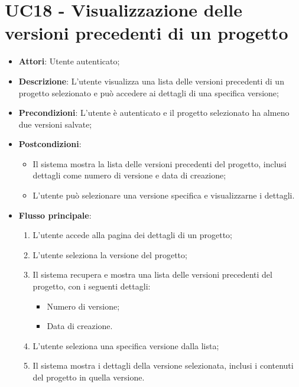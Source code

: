 \section*{UC18 - Visualizzazione delle versioni precedenti di un progetto}
\begin{itemize}
    \item \textbf{Attori}: Utente autenticato;
    \item \textbf{Descrizione}: L'utente visualizza una lista delle versioni precedenti di un progetto selezionato e può accedere ai dettagli di una specifica versione;
    \item \textbf{Precondizioni}: L'utente è autenticato e il progetto selezionato ha almeno due versioni salvate;
    \item \textbf{Postcondizioni}: 
    \begin{itemize}
        \item Il sistema mostra la lista delle versioni precedenti del progetto, inclusi dettagli come numero di versione e data di creazione;
        \item L'utente può selezionare una versione specifica e visualizzarne i dettagli.
    \end{itemize}
    \item \textbf{Flusso principale}:
    \begin{enumerate}
        \item L'utente accede alla pagina dei dettagli di un progetto;
        \item L'utente seleziona la versione del progetto;
        \item Il sistema recupera e mostra una lista delle versioni precedenti del progetto, con i seguenti dettagli:
        \begin{itemize}
            \item Numero di versione;
            \item Data di creazione.
        \end{itemize}
        \item L'utente seleziona una specifica versione dalla lista;
        \item Il sistema mostra i dettagli della versione selezionata, inclusi i contenuti del progetto in quella versione.
    \end{enumerate}
\end{itemize}

\vspace{0.5cm}  
